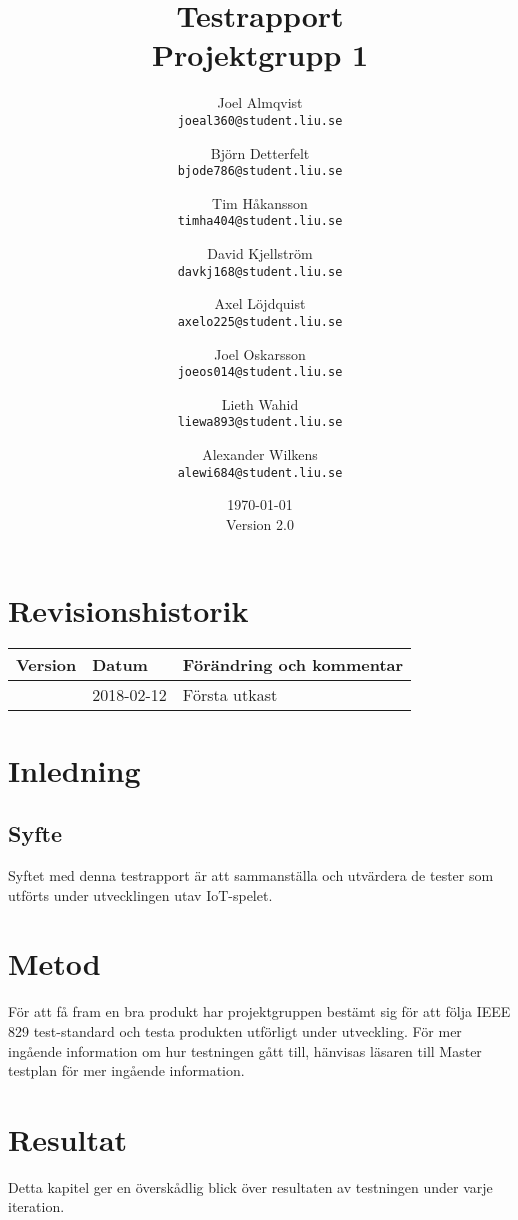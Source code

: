 \documentclass[10pt]{article}
\title{Testrapport\\
    \large Projektgrupp 1}
\author{
    Joel Almqvist\\
    \texttt{joeal360@student.liu.se}
    \and
    Björn Detterfelt\\
    \texttt{bjode786@student.liu.se}
    \and
    Tim Håkansson\\
    \texttt{timha404@student.liu.se}
    \and
    David Kjellström\\
    \texttt{davkj168@student.liu.se}
    \and
    Axel Löjdquist\\
    \texttt{axelo225@student.liu.se}
    \and
    Joel Oskarsson\\
    \texttt{joeos014@student.liu.se}
    \and
    Lieth Wahid\\
    \texttt{liewa893@student.liu.se}
    \and
    Alexander Wilkens\\
    \texttt{alewi684@student.liu.se}
}
\date{\today \\Version 2.0}
\begin{document}



\maketitle
\pagebreak
	\section*{Revisionshistorik}

	
	\begin{center}
 	   \begin{tabular}{| l | l | p{12cm} |  }
 	       \hline
 	       \textbf{Version} & \textbf{Datum} & \textbf{Förändring och kommentar} \\
 	       \hline
 	       \centering 0.1 & 2018-02-12 & Första utkast\\
		\hline
 	   \end{tabular}
	\end{center}

	
	
\pagebreak
\tableofcontents
\pagebreak
{}

\section{Inledning}

\subsection{Syfte}
Syftet med denna testrapport är att sammanställa och utvärdera de tester som utförts under utvecklingen utav IoT-spelet. 
  

\section{Metod}
 För att få fram en bra produkt har projektgruppen bestämt sig för att följa IEEE 829 test-standard \cite{ieee829} och testa produkten utförligt under utveckling. För mer ingående information om hur testningen gått till, hänvisas läsaren till Master testplan \cite{bib-mastertestplan} för mer ingående information.
\section{Resultat}
Detta kapitel ger en överskådlig blick över resultaten av testningen under varje iteration.
\end{document}
